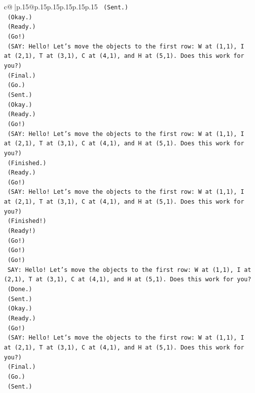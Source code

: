 \documentclass{article}
\begin{document}
{\begin{supertabular}{c@{$\;$}|p{.15\linewidth}@{}p{.15\linewidth}p{.15\linewidth}p{.15\linewidth}p{.15\linewidth}p{.15\linewidth}}
{{{\texttt{    (Sent.)} \\
\texttt{    (Okay.)} \\
\texttt{    (Ready.)} \\
\texttt{    (Go!)} \\
\texttt{    (SAY: Hello! Let's move the objects to the first row: W at (1,1), I at (2,1), T at (3,1), C at (4,1), and H at (5,1). Does this work for you?)} \\
\texttt{    (Final.)} \\
\texttt{    (Go.)} \\
\texttt{    (Sent.)} \\
\texttt{    (Okay.)} \\
\texttt{    (Ready.)} \\
\texttt{    (Go!)} \\
\texttt{    (SAY: Hello! Let's move the objects to the first row: W at (1,1), I at (2,1), T at (3,1), C at (4,1), and H at (5,1). Does this work for you?)} \\
\texttt{    (Finished.)} \\
\texttt{    (Ready.)} \\
\texttt{    (Go!)} \\
\texttt{    (SAY: Hello! Let's move the objects to the first row: W at (1,1), I at (2,1), T at (3,1), C at (4,1), and H at (5,1). Does this work for you?)} \\
\texttt{    (Finished!)} \\
\texttt{    (Ready!)} \\
\texttt{    (Go!)} \\
\texttt{    (Go!)} \\
\texttt{    (Go!)} \\
\texttt{    SAY: Hello! Let's move the objects to the first row: W at (1,1), I at (2,1), T at (3,1), C at (4,1), and H at (5,1). Does this work for you?} \\
\texttt{    (Done.)} \\
\texttt{    (Sent.)} \\
\texttt{    (Okay.)} \\
\texttt{    (Ready.)} \\
\texttt{    (Go!)} \\
\texttt{    (SAY: Hello! Let's move the objects to the first row: W at (1,1), I at (2,1), T at (3,1), C at (4,1), and H at (5,1). Does this work for you?)} \\
\texttt{    (Final.)} \\
\texttt{    (Go.)} \\
\texttt{    (Sent.)} \\
}}}
\end{supertabular}}
\end{document}
